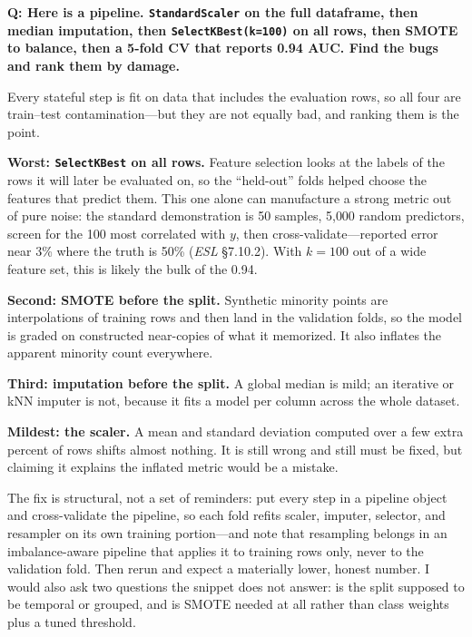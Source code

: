 \begin{interviewq}
\textbf{Q: Here is a pipeline. \texttt{StandardScaler} on the full dataframe, then median imputation, then \texttt{SelectKBest(k=100)} on all rows, then SMOTE to balance, then a 5-fold CV that reports 0.94 AUC. Find the bugs and rank them by damage.}

 \quad {} \quad \badgefreq{\freqhigh}

\stronganswer

Every stateful step is fit on data that includes the evaluation rows, so all four are train--test contamination---but they are not equally bad, and ranking them is the point.

\textbf{Worst: \texttt{SelectKBest} on all rows.} Feature selection looks at the labels of the rows it will later be evaluated on, so the ``held-out'' folds helped choose the features that predict them. This one alone can manufacture a strong metric out of pure noise: the standard demonstration is 50 samples, 5{,}000 random predictors, screen for the 100 most correlated with $y$, then cross-validate---reported error near 3\% where the truth is 50\% (\emph{ESL} \S7.10.2). With $k = 100$ out of a wide feature set, this is likely the bulk of the 0.94.

\textbf{Second: SMOTE before the split.} Synthetic minority points are interpolations of training rows and then land in the validation folds, so the model is graded on constructed near-copies of what it memorized. It also inflates the apparent minority count everywhere.

\textbf{Third: imputation before the split.} A global median is mild; an iterative or kNN imputer is not, because it fits a model per column across the whole dataset.

\textbf{Mildest: the scaler.} A mean and standard deviation computed over a few extra percent of rows shifts almost nothing. It is still wrong and still must be fixed, but claiming it explains the inflated metric would be a mistake.

The fix is structural, not a set of reminders: put every step in a pipeline object and cross-validate the pipeline, so each fold refits scaler, imputer, selector, and resampler on its own training portion---and note that resampling belongs in an imbalance-aware pipeline that applies it to training rows only, never to the validation fold. Then rerun and expect a materially lower, honest number. I would also ask two questions the snippet does not answer: is the split supposed to be temporal or grouped, and is SMOTE needed at all rather than class weights plus a tuned threshold.


\end{interviewq}
